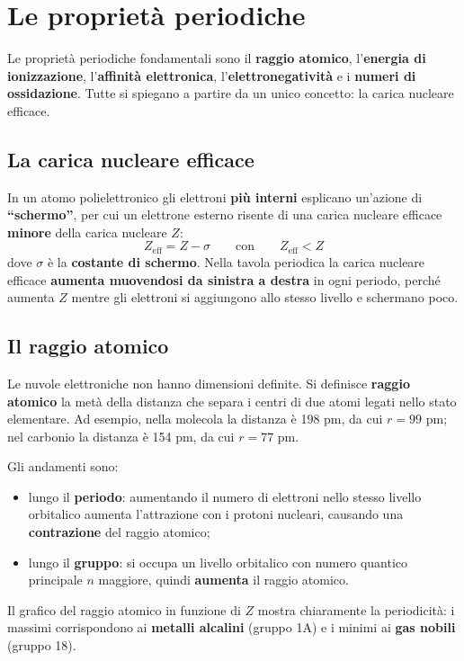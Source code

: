 \documentclass[11pt, a4paper, openright]{book}
\begin{document}
\section{Le proprietà periodiche}
Le proprietà periodiche fondamentali sono il \textbf{raggio atomico}, l'\textbf{energia di ionizzazione}, l'\textbf{affinità elettronica}, l'\textbf{elettronegatività} e i \textbf{numeri di ossidazione}. Tutte si spiegano a partire da un unico concetto: la carica nucleare efficace.

\subsection{La carica nucleare efficace}
In un atomo polielettronico gli elettroni \textbf{più interni} esplicano un'azione di \textbf{``schermo''}, per cui un elettrone esterno risente di una carica nucleare efficace \textbf{minore} della carica nucleare $Z$:
\[
Z_{\text{eff}} = Z - \sigma
\qquad\text{con}\qquad
Z_{\text{eff}} < Z
\]
dove $\sigma$ è la \textbf{costante di schermo}. Nella tavola periodica la carica nucleare efficace \textbf{aumenta muovendosi da sinistra a destra} in ogni periodo, perché aumenta $Z$ mentre gli elettroni si aggiungono allo stesso livello e schermano poco.

\subsection{Il raggio atomico}
Le nuvole elettroniche non hanno dimensioni definite. Si definisce \textbf{raggio atomico} la metà della distanza che separa i centri di due atomi legati nello stato elementare. Ad esempio, nella molecola  la distanza è 198 pm, da cui $r = 99$ pm; nel carbonio la distanza è 154 pm, da cui $r = 77$ pm.

Gli andamenti sono:
\begin{itemize}
    \item lungo il \textbf{periodo}: aumentando il numero di elettroni nello stesso livello orbitalico aumenta l'attrazione con i protoni nucleari, causando una \textbf{contrazione} del raggio atomico;
    \item lungo il \textbf{gruppo}: si occupa un livello orbitalico con numero quantico principale $n$ maggiore, quindi \textbf{aumenta} il raggio atomico.
\end{itemize}
Il grafico del raggio atomico in funzione di $Z$ mostra chiaramente la periodicità: i massimi corrispondono ai \textbf{metalli alcalini} (gruppo 1A) e i minimi ai \textbf{gas nobili} (gruppo 18).
\end{document}

